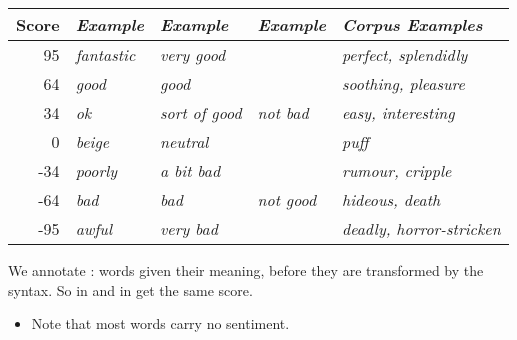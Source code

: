 \documentclass[a4paper,landscape,headrule,footrule,xetex]{foils}
\begin{document}
   \begin{tabular}{r>{\itshape}l>{\itshape}l>{\itshape}l>{\itshape}l}
      \textbf{Score} & \textbf{Example} & \textbf{Example} & \textbf{Example} & 
      \textbf{Corpus Examples} \\
      \hline
      95 & fantastic & very good     &            & {perfect}, splendidly  \\ 
      64 & good      & good          &            & {soothing}, pleasure  \\
      34 & ok        & sort of good  & not bad    & {easy}, interesting  \\ 
      0  & beige     & neutral       &            & {puff}  \\  
      -34 & poorly    & a bit bad     &            & rumour, cripple  \\
      -64 & bad       & bad           & not good   & {hideous}, death  \\
      -95 & awful     & very bad      &            & {deadly}, horror-stricken     
   \end{tabular}

   We annotate : words given their meaning, before they
   are transformed by the syntax.  So  in 
   and  in  get the same score.
   



\begin{itemize}
\item Note that most words carry no sentiment.
\end{itemize}



 
\newcommand{\ili}[1]{\href{https://lr.soh.ntu.edu.sg/omw/omw/concepts/ili/#1}{\url{i#1}}}
\end{document}
